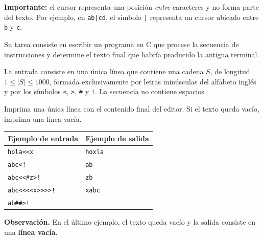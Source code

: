 \documentclass[11pt,letterpaper]{article}
\newcommand{\instruccion}[1]{\texttt{#1}}
\newcommand{\izq}{\textless\kern0pt}
\newcommand{\der}{\textgreater\kern0pt}
\newcommand{\seccion}[1]{\par\vspace{1.15em}{\Large\bfseries #1}\par\vspace{0.25em}}
\begin{document}
\textbf{Importante:} el cursor representa una posición \emph{entre} caracteres y no forma parte del texto. Por ejemplo, en \instruccion{ab|cd}, el símbolo \instruccion{|} representa un cursor ubicado entre \instruccion{b} y \instruccion{c}.

Su tarea consiste en escribir un programa en C que procese la secuencia de instrucciones y determine el texto final que habría producido la antigua terminal.

\newpage
\seccion{Entrada}
La entrada consiste en una única línea que contiene una cadena $S$, de longitud $1 \leq |S| \leq 1000$, formada exclusivamente por letras minúsculas del alfabeto inglés y por los símbolos \instruccion{\textless}, \instruccion{\textgreater}, \instruccion{\#} y \instruccion{!}. La secuencia no contiene espacios.

\seccion{Salida}
Imprima una única línea con el contenido final del editor. Si el texto queda vacío, imprima una línea vacía.

\seccion{Ejemplos}

\renewcommand{\arraystretch}{1.42}
\begin{tabularx}{\linewidth}{|>{\raggedright\arraybackslash}X|>{\raggedright\arraybackslash}X|}
  \hline
  \textbf{Ejemplo de entrada} & \textbf{Ejemplo de salida}\\
  \hline
  \instruccion{hola\izq\izq x} & \instruccion{hoxla}\\
  \hline
  \instruccion{abc\izq!} & \instruccion{ab}\\
  \hline
  \instruccion{abc\izq\izq\#z\der!} & \instruccion{zb}\\
  \hline
  \instruccion{abc\izq\izq\izq\izq x\der\der\der\der!} & \instruccion{xabc}\\
  \hline
  \instruccion{ab\#\#\der!} & \mbox{}\\
  \hline
\end{tabularx}

\vspace{0.8em}
\textbf{Observación.} En el último ejemplo, el texto queda vacío y la salida consiste en una \textbf{línea vacía}.
\end{document}
